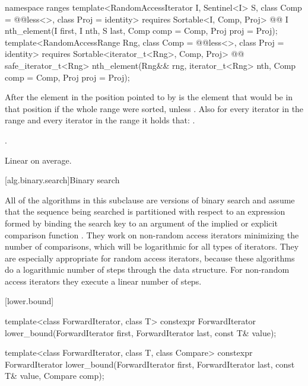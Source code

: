 \begin{addedblock}
%
\begin{itemdecl}
namespace ranges {
  template<RandomAccessIterator I, Sentinel<I> S, class Comp = @@less<>,
      class Proj = identity>
    requires Sortable<I, Comp, Proj>
    @@ I
      nth_element(I first, I nth, S last, Comp comp = Comp{}, Proj proj = Proj{});
  template<RandomAccessRange Rng, class Comp = @@less<>, class Proj = identity>
    requires Sortable<iterator_t<Rng>, Comp, Proj>
    @@ safe_iterator_t<Rng>
      nth_element(Rng&& rng, iterator_t<Rng> nth, Comp comp = Comp{}, Proj proj = Proj{});
}
\end{itemdecl}

\begin{itemdescr}
\pnum
After
the element in the position pointed to by 
is the element that would be
in that position if the whole range were sorted, unless .
Also for every iterator
in the range
and every iterator
in the range
it holds that:
.

\pnum
\returns {}.

\pnum
\complexity
Linear on average.
\end{itemdescr}
\end{addedblock}

[alg.binary.search]{Binary search}

\pnum
All of the algorithms in this subclause are versions of binary search
and assume that the sequence being searched is partitioned with respect to
an expression formed by binding the search key to an argument of the
implied or explicit comparison function .
They work on non-random access iterators minimizing the number of comparisons,
which will be logarithmic for all types of iterators.
They are especially appropriate for random access iterators,
because these algorithms do a logarithmic number of steps
through the data structure.
For non-random access iterators they execute a linear number of steps.

[lower.bound]{}

%
\begin{itemdecl}
template<class ForwardIterator, class T>
  constexpr ForwardIterator
    lower_bound(ForwardIterator first, ForwardIterator last,
                const T& value);

template<class ForwardIterator, class T, class Compare>
  constexpr ForwardIterator
    lower_bound(ForwardIterator first, ForwardIterator last,
                const T& value, Compare comp);
\end{itemdecl}

